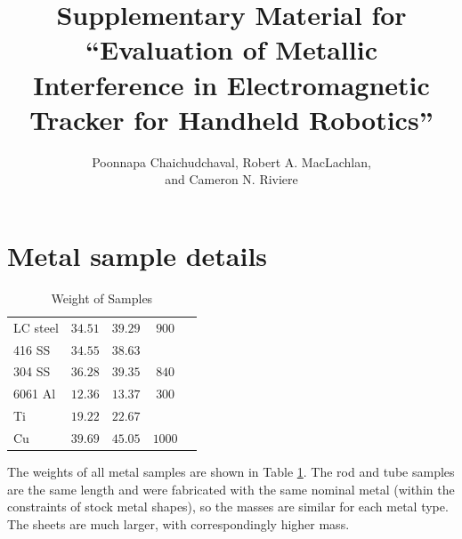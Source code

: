 \documentclass{article}
\begin{document}
\title{Supplementary Material for\\ “Evaluation of Metallic Interference in Electromagnetic Tracker for Handheld Robotics”}
\author{Poonnapa Chaichudchaval, Robert A. MacLachlan, \\and Cameron N. Riviere}
\maketitle

\section{Metal sample details}
\label{supplement: sample_weight}
\begin{table}[!htbp]
\caption{Weight of Samples}
\label{mat_size}
\setlength{\tabcolsep}{3pt}
\centering
\begin{tabular}{|l|c|c|c|c|}
\hline
\parbox{60pt}{} & 
\parbox{45pt}{} & 
\parbox{45pt}{} & 
\parbox{45pt}{}\\
\hline
LC steel& $34.51$& $39.29$&$900$\\
416 SS& $34.55$& $38.63$&$ $\\
304 SS& $36.28$& $39.35$&$840$\\
6061 Al& $12.36$& $13.37$&$300$\\
Ti& $19.22$& $22.67$&$ $ \\
Cu& $39.69$& $45.05$&$1000$ \\
\hline
\end{tabular}
\end{table}

The weights of all metal samples are shown in Table \ref{mat_size}. The rod and tube samples are the same length and were fabricated with the same nominal metal (within the constraints of stock metal shapes), so the masses are similar for each metal type. The sheets are much larger, with correspondingly higher mass.
\end{document}
